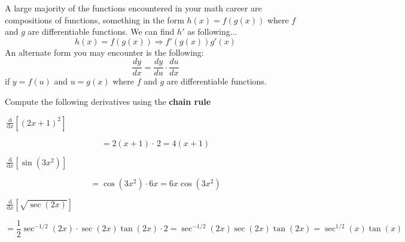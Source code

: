 \documentclass[addpoints]{exam}
\theoremstyle{definition}
\theoremstyle{plain}
\begin{document}
\begin{tcolorbox}[breakable, title=\subsection{CHAIN RULE}, colframe=black, sharp corners, colback=Azure4!30, colbacktitle=Firebrick2!60, coltitle=black]
    A large majority of the functions encountered in your math career are compositions of functions, something in the form $h(x) = f(g(x))$ where $f$ and $g$ are differentiable functions. We can find $h'$ as following...
    \[
        h(x) = f(g(x)) \Rightarrow f'(g(x))g'(x)
    \]
    An alternate form you may encounter is the following:
    \[
        \frac{dy}{dx} = \frac{dy}{du} \cdot \frac{du}{dx}
    \]
    if $y=f(u)$ and $u=g(x)$ where $f$ and $g$ are differentiable functions. 
\end{tcolorbox}
Compute the following derivatives using the \textbf{chain rule}
\begin{questions}
    \question $\displaystyle\,\frac{\mathrm{d}}{\mathrm{d}x}\left[\left(2x+1\right)^2\right]$
    \begin{solution}[\stretch{0.5}]
        \[ = 2\left(x+1\right)\cdot\,2 = 4\left(x+1\right)\]
    \end{solution}
    
    \question $\displaystyle\,\frac{\mathrm{d}}{\mathrm{d}x}\left[\sin\left(3x^2\right)\right]$
    \begin{solution}[\stretch{.5}]
        \[ = \cos\left(3x^2\right) \cdot 6x = 6x\cos\left(3x^2\right) \]
    \end{solution}
    
    \question $\displaystyle\,\frac{\mathrm{d}}{\mathrm{d}x}\left[\sqrt{\sec\left(2x\right)}\right]$
    \begin{solution}[\stretch{.5}]
        \[ = \frac{1}{2}\sec^{-1/2}\left(2x\right) \cdot \sec\left(2x\right)\tan\left(2x\right) \cdot 2 = \sec^{-1/2}\left(2x\right)\sec\left(2x\right)\tan\left(2x\right) = \sec^{1/2}\left(x\right)\tan\left(x\right)\]
    \end{solution}
\end{questions}

\newpage 
\end{document}

